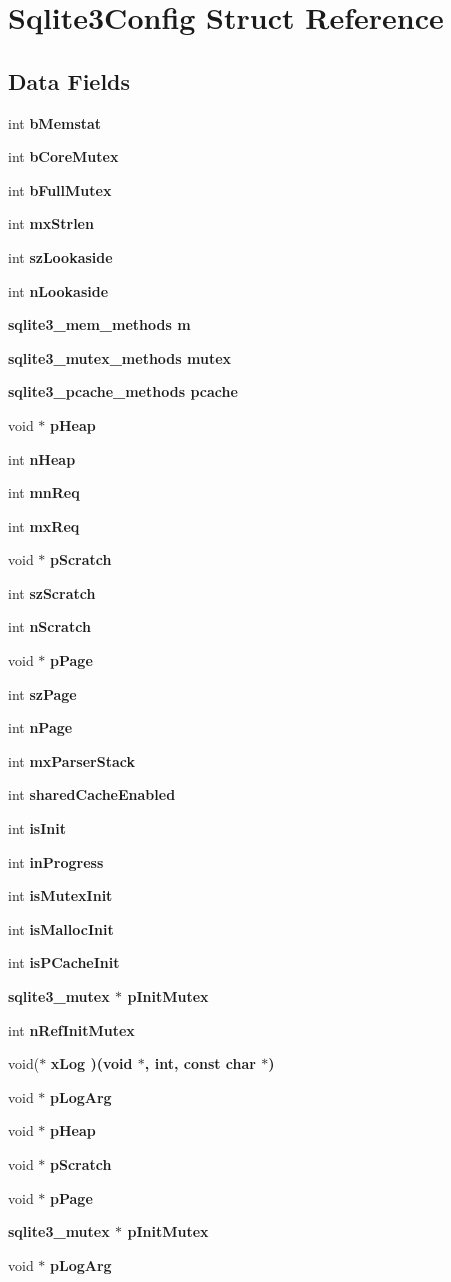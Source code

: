 \section{Sqlite3Config Struct Reference}
\label{structSqlite3Config}
\subsection*{Data Fields}
\begin{CompactItemize}
\item 
int \bf{b\-Memstat}
\item 
int \bf{b\-Core\-Mutex}
\item 
int \bf{b\-Full\-Mutex}
\item 
int \bf{mx\-Strlen}
\item 
int \bf{sz\-Lookaside}
\item 
int \bf{n\-Lookaside}
\item 
\bf{sqlite3\_\-mem\_\-methods} \bf{m}
\item 
\bf{sqlite3\_\-mutex\_\-methods} \bf{mutex}
\item 
\bf{sqlite3\_\-pcache\_\-methods} \bf{pcache}
\item 
void $\ast$ \bf{p\-Heap}
\item 
int \bf{n\-Heap}
\item 
int \bf{mn\-Req}
\item 
int \bf{mx\-Req}
\item 
void $\ast$ \bf{p\-Scratch}
\item 
int \bf{sz\-Scratch}
\item 
int \bf{n\-Scratch}
\item 
void $\ast$ \bf{p\-Page}
\item 
int \bf{sz\-Page}
\item 
int \bf{n\-Page}
\item 
int \bf{mx\-Parser\-Stack}
\item 
int \bf{shared\-Cache\-Enabled}
\item 
int \bf{is\-Init}
\item 
int \bf{in\-Progress}
\item 
int \bf{is\-Mutex\-Init}
\item 
int \bf{is\-Malloc\-Init}
\item 
int \bf{is\-PCache\-Init}
\item 
\bf{sqlite3\_\-mutex} $\ast$ \bf{p\-Init\-Mutex}
\item 
int \bf{n\-Ref\-Init\-Mutex}
\item 
void($\ast$ \bf{x\-Log} )(void $\ast$, int, const char $\ast$)
\item 
void $\ast$ \bf{p\-Log\-Arg}
\item 
void $\ast$ \bf{p\-Heap}
\item 
void $\ast$ \bf{p\-Scratch}
\item 
void $\ast$ \bf{p\-Page}
\item 
\bf{sqlite3\_\-mutex} $\ast$ \bf{p\-Init\-Mutex}
\item 
void $\ast$ \bf{p\-Log\-Arg}
\end{CompactItemize}


